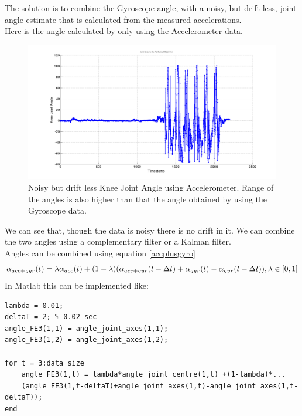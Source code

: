 \documentclass[12pt]{article}
\begin{document}
The solution is to combine the Gyroscope angle, with a noisy, but drift less, joint angle estimate that is calculated from the measured accelerations.\\

Here is the angle calculated by only using the Accelerometer data.\\
\begin{figure}[!htb]
\includegraphics[scale=.3,center]{noisyacceangle.png}
\caption{Noisy but drift less Knee Joint Angle using Accelerometer. Range of the angles is also higher than that the angle obtained by using the Gyroscope data.}
\label{diffproject}
\end{figure}

\FloatBarrier

We can see that, though the data is noisy there is no drift in it. We can combine the two angles using a complementary filter or a Kalman filter.\\
Angles can be combined using equation \ref{accplusgyro}
\begin{equation}\label{accplusgyro}
\alpha_{acc+gyr}(t) = \lambda \alpha_{acc}(t) +(1-\lambda)(\alpha_{acc+gyr}(t-\Delta t)+\alpha_{gyr}(t) - \alpha_{gyr}(t-\Delta t)), \vspace{2em} \lambda \in [0,1]
\end{equation}
In Matlab this can be implemented like:

\begin{verbatim}
lambda = 0.01;
deltaT = 2; % 0.02 sec
angle_FE3(1,1) = angle_joint_axes(1,1);
angle_FE3(1,2) = angle_joint_axes(1,2);

for t = 3:data_size
    angle_FE3(1,t) = lambda*angle_joint_centre(1,t) +(1-lambda)*...
    (angle_FE3(1,t-deltaT)+angle_joint_axes(1,t)-angle_joint_axes(1,t-deltaT));
end
\end{verbatim}
\end{document}
